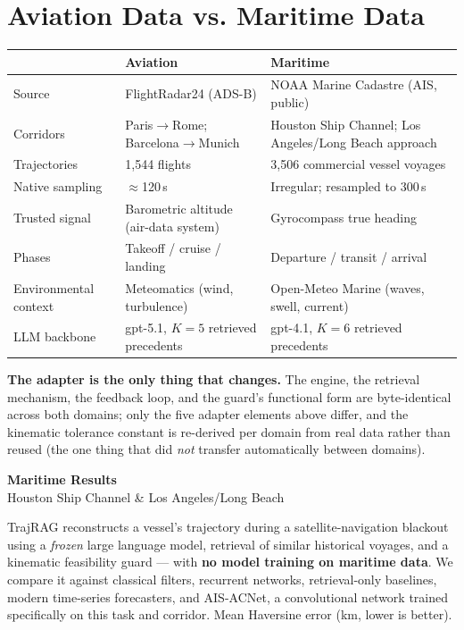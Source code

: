 \documentclass[10pt]{article}
\begin{document}
\section*{Aviation Data vs. Maritime Data}

\begin{center}
\begin{tabular}{p{2.6cm}p{6.3cm}p{6.3cm}}
\toprule
 & \textbf{Aviation} & \textbf{Maritime} \\
\midrule
Source & FlightRadar24 (ADS-B) & NOAA Marine Cadastre (AIS, public) \\
Corridors & Paris$\to$Rome; Barcelona$\to$Munich & Houston Ship Channel; Los Angeles/Long Beach approach \\
Trajectories & 1,544 flights & 3,506 commercial vessel voyages \\
Native sampling & $\approx$120\,s & Irregular; resampled to 300\,s \\
Trusted signal & Barometric altitude (air-data system) & Gyrocompass true heading \\
Phases & Takeoff / cruise / landing & Departure / transit / arrival \\
Environmental context & Meteomatics (wind, turbulence) & Open-Meteo Marine (waves, swell, current) \\
LLM backbone & gpt-5.1, $K{=}5$ retrieved precedents & gpt-4.1, $K{=}6$ retrieved precedents \\
\bottomrule
\end{tabular}
\end{center}
\vspace{2pt}

\textbf{The adapter is the only thing that changes.} The engine, the
retrieval mechanism, the feedback loop, and the guard's functional form are
byte-identical across both domains; only the five adapter elements above
differ, and the kinematic tolerance constant is re-derived per domain from
real data rather than reused (the one thing that did \emph{not} transfer
automatically between domains).

\newpage
\begin{center}
{\LARGE\bfseries Maritime Results}\\[2pt]
{\large Houston Ship Channel \& Los Angeles/Long Beach}
\end{center}
\vspace{2pt}

TrajRAG reconstructs a vessel's trajectory during a satellite-navigation
blackout using a \emph{frozen} large language model, retrieval of similar
historical voyages, and a kinematic feasibility guard --- with \textbf{no
model training on maritime data}. We compare it against classical filters,
recurrent networks, retrieval-only baselines, modern time-series
forecasters, and AIS-ACNet, a convolutional network trained specifically on
this task and corridor. Mean Haversine error (km, lower is better).
\end{document}
